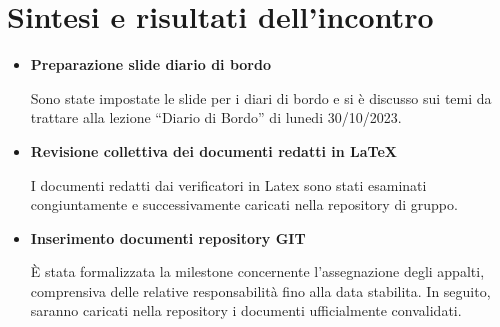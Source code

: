 \documentclass{article}
\begin{document}
\section*{\textbf{Sintesi e risultati dell’incontro}}

\begin{itemize}
\item \textbf{\fontsize{12}{6}\selectfont Preparazione slide diario di bordo}

Sono state impostate le slide per i diari di bordo e si è discusso sui temi da trattare alla lezione “Diario  di Bordo” di lunedi 30/10/2023.
\vspace{0.5cm}

\item \textbf{\fontsize{12}{6}\selectfont Revisione collettiva dei documenti redatti in LaTeX}

I documenti redatti dai verificatori in Latex sono stati esaminati congiuntamente e successivamente caricati nella repository di gruppo.
\vspace{0.5cm}

\item \textbf{\fontsize{12}{6}\selectfont Inserimento documenti repository GIT}

È stata formalizzata la milestone concernente l'assegnazione degli appalti, comprensiva delle relative responsabilità fino alla data stabilita. In seguito, saranno caricati nella repository i documenti ufficialmente convalidati.
\vspace{0.5cm}
\end{itemize}
\end{document}
